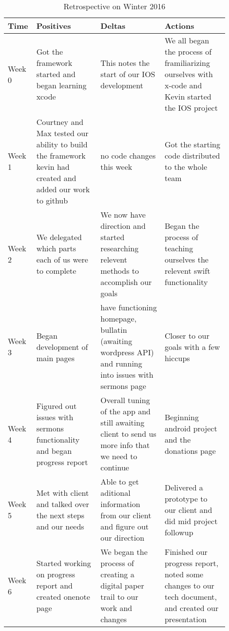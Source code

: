 \documentclass[letterpaper,10pt,draftclsnofoot,onecolumn,titlepage]{IEEEtran}
\begin{document}
		\begin{table}[H]
			\caption{Retrospective on Winter 2016}
			\begin{center}
				\begin{tabular}{| p{0.06\linewidth} | p{0.28\linewidth} | p{0.28\linewidth} | p{0.28\linewidth} | }
					\hline
					\textbf{Time} & \textbf{Positives} & \textbf{Deltas} & \textbf{Actions} \\ [0.5ex]
					\hline
					Week 0 & Got the framework started and began learning xcode & This notes the start of our IOS development & We all began the process of framiliarizing ourselves with x-code and Kevin started the IOS project \\
					\hline
					Week 1 & Courtney and Max tested our ability to build the framework kevin had created and added our work to github & no code changes this week & Got the starting code distributed to the whole team \\
					\hline
					Week 2 & We delegated which parts each of us were to complete & We now have direction and started researching relevent methods to accomplish our goals & Began the process of teaching ourselves the relevent swift functionality \\
					\hline
					Week 3 & Began development of main pages & have functioning homepage, bullatin (awaiting wordpress API) and running into issues with sermons page & Closer to our goals with a few hiccups \\
					\hline
					Week 4 & Figured out issues with sermons functionality and began progress report & Overall tuning of the app and still awaiting client to send us more info that we need to continue & Beginning android project and the donations page \\
					\hline
					Week 5 & Met with client and talked over the next steps and our needs & Able to get aditional information from our client and figure out our direction & Delivered a prototype to our client and did mid project followup \\
					\hline
					Week 6 & Started working on progress report and created onenote page & We began the process of creating a digital paper trail to our work and changes & Finished our progress report, noted some changes to our tech document, and created our presentation \\
					\hline

\end{tabular}
			\end{center}
			\end{table}
\end{document}
